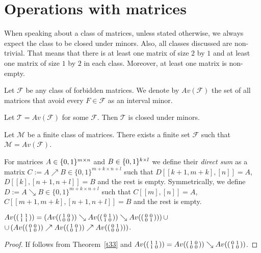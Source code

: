 \section{Operations with matrices}
\begin{ntn}
When speaking about a class of matrices, unless stated otherwise, we always expect the class to be closed under minors. Also, all classes discussed are non-trivial. That means that there is at least one matrix of size $2$ by $1$ and at least one matrix of size $1$ by $2$ in each class. Moreover, at least one matrix is non-empty.
\end{ntn}
\begin{defn}
Let $\mathcal{F}$ be any class of forbidden matrices. We denote by $Av(\mathcal{F})$ the set of all matrices that avoid every $F\in\mathcal{F}$ as an interval minor.
\end{defn}
\begin{obs}
Let $\mathcal{T}=Av(\mathcal{F})$ for some $\mathcal{F}$. Then $\mathcal{T}$ is closed under minors.
\end{obs}
\begin{obs}
Let $\mathcal{M}$ be a finite class of matrices. There exists a finite set $\mathcal{F}$ such that $\mathcal{M}=Av(\mathcal{F})$.
\end{obs}
\begin{defn}
For matrices $A\in\{0,1\}^{m\times n}$ and $B\in\{0,1\}^{k\times l}$ we define their \emph{direct sum} as a matrix $C:=A\nearrow B\in\{0,1\}^{m+k\times n+l}$ such that $D[[k+1,m+k],[n]]=A$, $D[[k],[n+1,n+l]]=B$ and the rest is empty. Symmetrically, we define $D:=A\searrow B\in\{0,1\}^{m+k\times n+l}$ such that $C[[m],[n]]=A$, $C[[m+1,m+k],[n+1,n+l]]=B$ and the rest is empty.
\end{defn}
\begin{thm}
$Av(\left(\begin{smallmatrix}1&1\\1&1\end{smallmatrix}\right))=\left(Av(\left(\begin{smallmatrix}1&0\\0&0\end{smallmatrix}\right))\searrow Av(\left(\begin{smallmatrix}0&1\\1&0\end{smallmatrix}\right))\searrow Av(\left(\begin{smallmatrix}0&0\\0&1\end{smallmatrix}\right))\right)\cup$\\
$\cup\left(Av(\left(\begin{smallmatrix}0&0\\1&0\end{smallmatrix}\right))\nearrow Av(\left(\begin{smallmatrix}1&0\\0&1\end{smallmatrix}\right))\nearrow Av(\left(\begin{smallmatrix}0&1\\0&0\end{smallmatrix}\right))\right)$.
\end{thm}
\begin{proof}
If follows from Theorem~\ref{t33} and $Av(\left(\begin{smallmatrix}1&1\\1&0\end{smallmatrix}\right))=Av(\left(\begin{smallmatrix}1&0\\0&0\end{smallmatrix}\right))\searrow Av(\left(\begin{smallmatrix}0&1\\1&0\end{smallmatrix}\right))$.
\end{proof}
